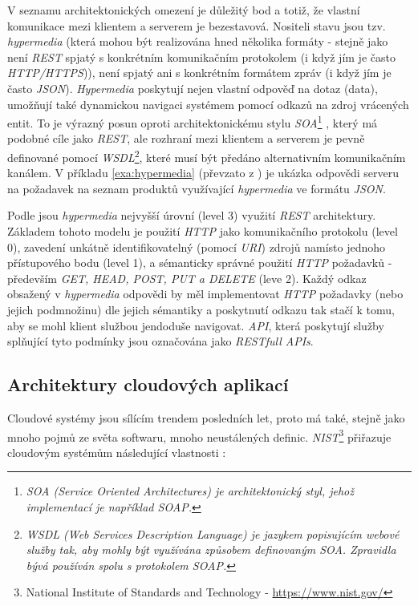 V seznamu architektonických omezení je důležitý bod a totiž, že vlastní komunikace mezi klientem a serverem je bezestavová. Nositeli stavu jsou tzv. \textit{hypermedia} (která mohou být realizována hned několika formáty - stejně jako není \textit{REST} spjatý s konkrétním komunikačním protokolem (i když jím je často \textit{HTTP/HTTPS})), není spjatý ani s konkrétním formátem zpráv (i když jím je často \textit{JSON}). \textit{Hypermedia} poskytují nejen vlastní odpověď na dotaz (data), umožňují také dynamickou navigaci systémem pomocí odkazů na zdroj vrácených entit. To je výrazný posun oproti architektonickému stylu \textit{SOA}\footnote{\textit{SOA (Service Oriented Architectures) je architektonický styl, jehož implementací je například SOAP.}} , který má podobné cíle jako \textit{REST}, ale rozhraní mezi klientem a serverem je pevně definované pomocí \textit{WSDL}\footnote{\textit{WSDL (Web Services Description Language) je jazykem popisujícím webové služby tak, aby mohly být využívána způsobem definovaným \textit{SOA}. Zpravidla bývá používán spolu s protokolem \textit{SOAP}.}}, které musí být předáno alternativním komunikačním kanálem.
V příkladu \ref{exa:hypermedia} (převzato z \cite{Spring18}) je ukázka odpovědi serveru na požadavek na seznam produktů využívající \textit{hypermedia} ve formátu \textit{JSON}.



Podle \cite{Fowler10} jsou \textit{hypermedia} nejvyšší úrovní (level 3) využití \textit{REST} architektury. Základem tohoto modelu je použití \textit{HTTP} jako komunikačního protokolu (level 0), zavedení unkátně identifikovatelný (pomocí \textit{URI}) zdrojů namísto jednoho přístupového bodu (level 1), a sémanticky správné použití \textit{HTTP} požadavků - především \textit{GET, HEAD, POST, PUT a DELETE} (leve 2). Každý odkaz obsažený v \textit{hypermedia} odpovědi by měl implementovat \textit{HTTP} požadavky (nebo jejich podmnožinu) dle jejich sémantiky a poskytnutí odkazu tak stačí k tomu, aby se mohl klient službou jendoduše navigovat. \textit{API}, která poskytují služby splňující tyto podmínky jsou označována jako \textit{RESTfull APIs}.

\subsection{Architektury cloudových aplikací}
\label{sec:cloud}
Cloudové systémy jsou sílícím trendem posledních let, proto má také, stejně jako mnoho pojmů ze světa softwaru, mnoho neustálených definic. \textit{NIST}\footnote{National Institute of Standards and Technology - \url{https://www.nist.gov/}} přiřazuje cloudovým systémům následující vlastnosti \cite{Mell11} :

